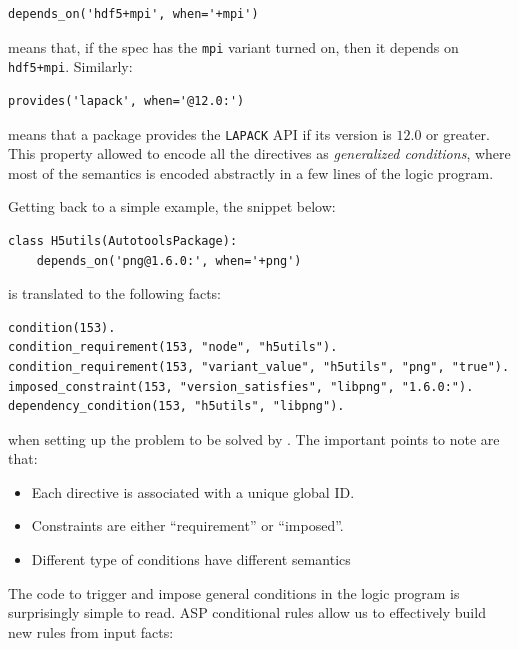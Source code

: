 \begin{verbatim}
depends_on('hdf5+mpi', when='+mpi')
\end{verbatim}

means that, if the spec has the \texttt{mpi} variant turned on, then it depends on \texttt{hdf5+mpi}. Similarly:

\begin{verbatim}
provides('lapack', when='@12.0:')
\end{verbatim}

means that a package provides the \texttt{LAPACK} API if its version is $12.0$ or greater.
This property allowed to encode all the directives as \emph{generalized conditions}, where most of the semantics is encoded abstractly in a few lines of the logic program.

Getting back to a simple example, the snippet below:

\begin{verbatim}
class H5utils(AutotoolsPackage):
    depends_on('png@1.6.0:', when='+png')
\end{verbatim}

is translated to the following facts:

\begin{verbatim}
condition(153).
condition_requirement(153, "node", "h5utils").
condition_requirement(153, "variant_value", "h5utils", "png", "true").
imposed_constraint(153, "version_satisfies", "libpng", "1.6.0:").
dependency_condition(153, "h5utils", "libpng").
\end{verbatim}

when setting up the problem to be solved by \clingo. The important points to note are that:

\begin{itemize}
\item Each directive is associated with a unique global ID.
\item Constraints are either ``requirement'' or ``imposed''.
\item Different type of conditions have different semantics\footnotemark
\end{itemize}
The code to trigger and impose general conditions in the logic program is surprisingly simple to read. ASP conditional rules allow us to effectively build new rules from input facts:

